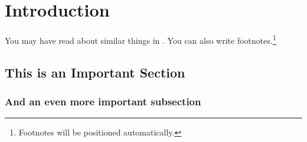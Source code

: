 \chapter{Introduction}\label{ch:intro}

You may have read about similar things in \cite{Goodliffe2007}.
You can also write footnotes.\footnote{Footnotes will be positioned automatically.}
\blindtext

\blindtext

\section{This is an Important Section}
\blindtext

\subsection{And an even more important subsection}
\blindtext
